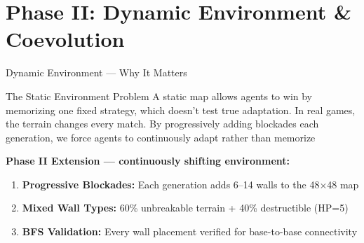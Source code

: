 \documentclass[aspectratio=169, 11pt]{beamer}
\begin{document}
\section{Phase II: Dynamic Environment \& Coevolution}
\begin{frame}{Dynamic Environment --- Why It Matters}
\begin{block}{The Static Environment Problem}
A static map allows agents to win by memorizing one fixed strategy, which doesn't test true adaptation. In real games, the terrain changes every match. By progressively adding blockades each generation, we force agents to continuously adapt rather than memorize
\end{block}
\vspace{0.15cm}
\textbf{Phase II Extension --- continuously shifting environment:}
\begin{enumerate}
    \item \textbf{Progressive Blockades:} Each generation adds 6--14 walls to the 48$\times$48 map
    \item \textbf{Mixed Wall Types:} 60\% unbreakable terrain + 40\% destructible (HP=5)
    \item \textbf{BFS Validation:} Every wall placement verified for base-to-base connectivity
\end{enumerate}
\vspace{0.1cm}
\end{frame}
\end{document}
